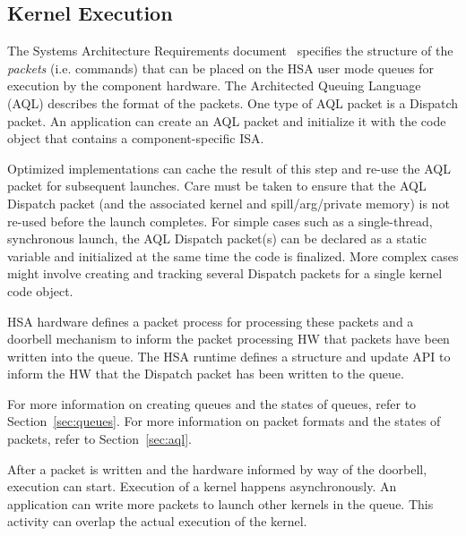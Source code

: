 \documentclass[final]{book}
\begin{document}
\subsection{Kernel Execution}
The Systems Architecture Requirements document~\cite{sar} specifies the
structure of the \emph{packets} (i.e. commands) that can be placed on the HSA
user mode queues for execution by the component hardware. The Architected 
Queuing Language (AQL) describes the format of the packets. One type of
AQL packet is a Dispatch packet. An application can create an AQL packet 
and initialize it with the code object that contains a component-specific ISA. 

Optimized implementations can cache the result of this step and re-use the AQL
packet for subsequent launches. Care must be taken to ensure that the AQL
Dispatch packet (and the associated kernel and spill/arg/private memory) is not
re-used before the launch completes. For simple cases such as a
single-thread, synchronous launch, the AQL Dispatch packet(s) can be declared
as a static variable and initialized at the same time the code is
finalized. More complex cases might involve creating and tracking several 
Dispatch packets for a single kernel code object.

HSA hardware defines a packet process for processing these packets and a doorbell
mechanism to inform the packet processing HW that packets have been written into
the queue. The HSA runtime defines a structure and update API to inform the HW
that the Dispatch packet has been written to the queue. 

For more information on creating queues and the states of queues, refer to 
Section~\ref{sec:queues}. For more information on packet formats and the states 
of packets, refer to Section~\ref{sec:aql}. 

After a packet is written and the hardware informed by way of the doorbell, 
execution can start. Execution of a kernel happens asynchronously. An application 
can write more packets to launch other kernels in the queue. This activity can
overlap the actual execution of the kernel.
\end{document}
